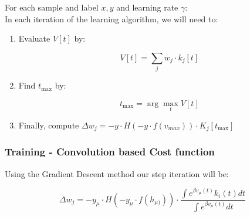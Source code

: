 \begin{mdframed}[backgroundcolor=green_background, linecolor=black, linewidth=2pt, frametitle=\textbf{Pseudo-code}]

For each sample and label \(x, y\) and learning rate \(\gamma\): \\
In each iteration of the learning algorithm, we will need to:

\begin{enumerate}

    \item Evaluate $V[t]$ by: 

\begin{equation}
    V[t] = \sum_{j} w_j \cdot k_j[t]
\end{equation}

    \item Find $t_{\text{max}}$ by: 

\begin{equation}
    t_{\text{max}} = \arg\max_t V[t]
\end{equation}

    \item Finally, compute $\Delta w_j = -y \cdot H(-y \cdot f(v_{max})) \cdot K_j[t_{\text{max}}]$

\end{enumerate}
\end{mdframed}

\subsubsection{Training - Convolution based Cost function}

\label{sssec:training-conv-cost}

\begin{mdframed}[backgroundcolor=red_background, linecolor=black, linewidth=2pt, frametitle=\textbf{Statement}]
\begin{center}

    \label{st:GD-convl-medel}
    Using the Gradient Descent method our step iteration will be:

    \begin{equation}
        \Delta w_j = -y_{\mu} \cdot H(-y_{\mu} \cdot f(h_{\mu)})) \cdot \frac{\int e^{\beta v_{\mu}(t)} k_i(t) dt}{\int e^{\beta v_{\mu}(t)} dt}
    \end{equation}

\end{center}
\end{mdframed}

